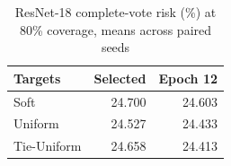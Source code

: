 \begin{table}[htbp]
\caption{ResNet-18 complete-vote risk (\%) at 80\% coverage, means across paired seeds}\label{tab:resnetrisk}
\centering\begin{tabular}{lrr}\toprule
Targets & Selected & Epoch 12\\\midrule
Soft & 24.700 & 24.603\\
Uniform & 24.527 & 24.433\\
Tie-Uniform & 24.658 & 24.413\\
\bottomrule\end{tabular}\par
\end{table}
